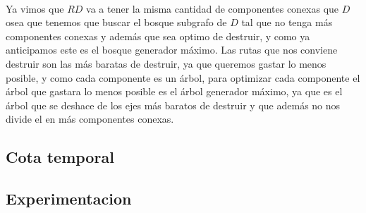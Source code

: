 \\
\par
Ya vimos que $RD$ va a tener la misma cantidad de componentes conexas que $D$ osea que tenemos que buscar el bosque subgrafo de $D$ tal que no tenga más componentes conexas y además que sea optimo de destruir, y como ya anticipamos este es el bosque generador máximo. Las rutas que nos conviene destruir son las más baratas de destruir, ya que queremos gastar lo menos posible, y como cada componente es un árbol, para optimizar cada componente el árbol que gastara lo menos posible es el árbol generador máximo, ya que es el árbol que se deshace de los ejes más baratos de destruir y que  además no nos divide el en más componentes conexas.

\subsection{Cota temporal}

\subsection{Experimentacion}

\pagebreak